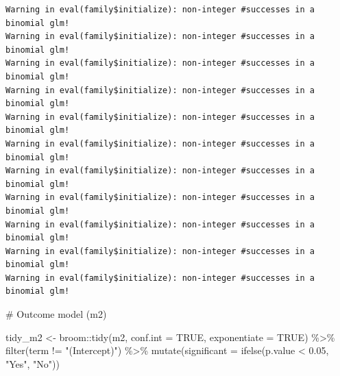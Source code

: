 \documentclass[
  letterpaper,
  DIV=11,
  numbers=noendperiod]{scrartcl}
\newenvironment{Shaded}{\begin{snugshade}}{\end{snugshade}}
\newcommand{\AttributeTok}[1]{\textcolor[rgb]{0.40,0.45,0.13}{#1}}
\newcommand{\CommentTok}[1]{\textcolor[rgb]{0.37,0.37,0.37}{#1}}
\newcommand{\ConstantTok}[1]{\textcolor[rgb]{0.56,0.35,0.01}{#1}}
\newcommand{\FloatTok}[1]{\textcolor[rgb]{0.68,0.00,0.00}{#1}}
\newcommand{\FunctionTok}[1]{\textcolor[rgb]{0.28,0.35,0.67}{#1}}
\newcommand{\NormalTok}[1]{\textcolor[rgb]{0.00,0.23,0.31}{#1}}
\newcommand{\OtherTok}[1]{\textcolor[rgb]{0.00,0.23,0.31}{#1}}
\newcommand{\SpecialCharTok}[1]{\textcolor[rgb]{0.37,0.37,0.37}{#1}}
\newcommand{\StringTok}[1]{\textcolor[rgb]{0.13,0.47,0.30}{#1}}
\begin{document}
\begin{verbatim}
Warning in eval(family$initialize): non-integer #successes in a binomial glm!
Warning in eval(family$initialize): non-integer #successes in a binomial glm!
Warning in eval(family$initialize): non-integer #successes in a binomial glm!
Warning in eval(family$initialize): non-integer #successes in a binomial glm!
Warning in eval(family$initialize): non-integer #successes in a binomial glm!
Warning in eval(family$initialize): non-integer #successes in a binomial glm!
Warning in eval(family$initialize): non-integer #successes in a binomial glm!
Warning in eval(family$initialize): non-integer #successes in a binomial glm!
Warning in eval(family$initialize): non-integer #successes in a binomial glm!
Warning in eval(family$initialize): non-integer #successes in a binomial glm!
Warning in eval(family$initialize): non-integer #successes in a binomial glm!
\end{verbatim}

\begin{Shaded}
\begin{Highlighting}[]
\CommentTok{\# Outcome model (m2)}

\NormalTok{tidy\_m2 }\OtherTok{\textless{}{-}}\NormalTok{ broom}\SpecialCharTok{::}\FunctionTok{tidy}\NormalTok{(m2, }\AttributeTok{conf.int =} \ConstantTok{TRUE}\NormalTok{, }\AttributeTok{exponentiate =} \ConstantTok{TRUE}\NormalTok{) }\SpecialCharTok{\%\textgreater{}\%}
\FunctionTok{filter}\NormalTok{(term }\SpecialCharTok{!=} \StringTok{"(Intercept)"}\NormalTok{) }\SpecialCharTok{\%\textgreater{}\%}
\FunctionTok{mutate}\NormalTok{(}\AttributeTok{significant =} \FunctionTok{ifelse}\NormalTok{(p.value }\SpecialCharTok{\textless{}} \FloatTok{0.05}\NormalTok{, }\StringTok{"Yes"}\NormalTok{, }\StringTok{"No"}\NormalTok{))}
\end{Highlighting}
\end{Shaded}
\end{document}

